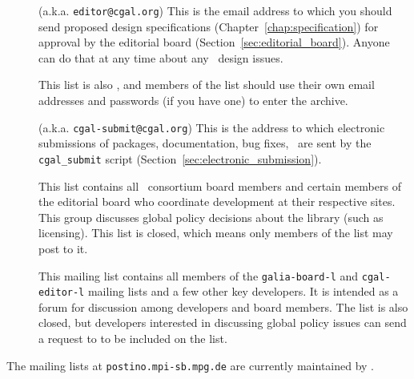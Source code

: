 \begin{description}
\item[] 
     (a.k.a. \texttt{editor@cgal.org})
     This is the email address to which you should
     send proposed design specifications (Chapter~\ref{chap:specification})
     for approval by the editorial 
     board (Section~\ref{sec:editorial_board}). Anyone can do that 
     at any time about any \cgal\ design issues. 

     This list is also
     , and members of the list should use their own
     email addresses and passwords (if you have one) to enter the archive.

\item[] 
     (a.k.a. \texttt{cgal-submit@cgal.org})
     This is the address to which electronic
     submissions of packages, documentation, bug fixes, \etc\ are
     sent by the \texttt{cgal\_submit} script
     (Section~\ref{sec:electronic_submission}).

\item[] 
     This list contains all \galia\ consortium board members and certain 
     members of the editorial board who coordinate development at their 
     respective sites.
     This group discusses global policy decisions about the library (such
     as licensing).  This list is closed, which means only members of the list 
     may post to it.

\item[] 
     This mailing list contains all members of the \texttt{galia-board-l} and
     \texttt{cgal-editor-l} mailing lists and a few other key developers.
     It is intended as a forum for discussion among developers and board 
     members.  The list is also closed, but developers interested in 
     discussing global policy issues can send a request to 
      to be included
     on the list.
\end{description}

The mailing lists at \texttt{postino.mpi-sb.mpg.de} 
are currently
maintained by . 
